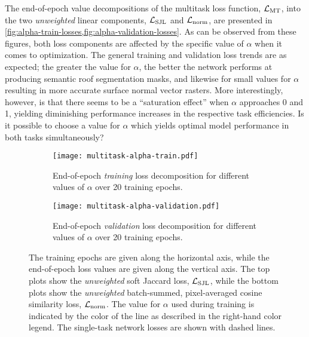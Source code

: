 The end-of-epoch value decompositions of the multitask loss function, $\mathcal{L}_{\mathrm{MT}}$, into the two \emph{unweighted} linear components, $\mathcal{L}_{\mathrm{SJL}}$ and $\mathcal{L}_{\mathrm{norm}}$, are presented in \cref{fig:alpha-train-losses,fig:alpha-validation-losses}.
As can be observed from these figures, both loss components are affected by the specific value of $\alpha$ when it comes to optimization.
The general training and validation loss trends are as expected; the greater the value for $\alpha$, the better the network performs at producing semantic roof segmentation masks, and likewise for small values for $\alpha$ resulting in more accurate surface normal vector rasters.
More interestingly, however, is that there seems to be a \enquote{saturation effect} when $\alpha$ approaches 0 and 1, yielding diminishing performance increases in the respective task efficiencies.
Is it possible to choose a value for $\alpha$ which yields optimal model performance in both tasks simultaneously?
\begin{figure}[H]
  \centering
  \begin{subfigure}[t]{\textwidth}
    \centering
    \texttt{[image: multitask-alpha-train.pdf]}
    \caption{%
      End-of-epoch \emph{training} loss decomposition for different values of $\alpha$ over 20 training epochs.
    }
    \label{fig:alpha-train-losses}
  \end{subfigure}
  \par\bigskip %
  \begin{subfigure}[t]{\textwidth}
    \centering
    \texttt{[image: multitask-alpha-validation.pdf]}
    \caption{%
      End-of-epoch \emph{validation} loss decomposition for different values of $\alpha$ over 20 training epochs.
    }
    \label{fig:alpha-validation-losses}
  \end{subfigure}
  \caption[End-of-epoch multitask loss decomposition for different values of $\alpha$ over 20 training epochs.]{%
    The training epochs are given along the horizontal axis, while the end-of-epoch loss values are given along the vertical axis.
    The top plots show the \emph{unweighted} soft Jaccard loss, $\mathcal{L}_{\mathrm{SJL}}$, while the bottom plots show the \emph{unweighted} batch-summed, pixel-averaged cosine similarity loss, $\mathcal{L}_{\mathrm{norm}}$.
    The value for $\alpha$ used during training is indicated by the color of the line as described in the right-hand color legend.
    The single-task network losses are shown with dashed lines.
  }
\end{figure}


